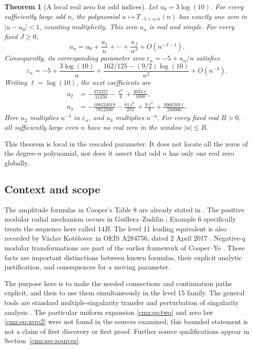 \documentclass[11pt,letterpaper]{article}
\numberwithin{equation}{section}
\newtheorem{theorem}{Theorem}[section]
\theoremstyle{definition}\newtheorem{definition}[theorem]{Definition}
\theoremstyle{remark}\newtheorem{remark}[theorem]{Remark}
\newcommand{\eps}{\varepsilon}
\begin{document}
\begin{theorem}[A local real zero for odd indices]
\label{cmz:thm:zero}
Let $u_0=3\log(10)$. For every sufficiently large odd $n$, the polynomial $u\mapsto T_{-5+u/n}(n)$ has exactly one zero in $|u-u_0|<1$, counting multiplicity. This zero $u_n$ is real and simple. For every fixed $J\geq0$,
\begin{equation}
u_n=u_0+\frac{u_1}{n}+\cdots+\frac{u_J}{n^J}+O(n^{-J-1}).
\label{cmz:eq:uexp}
\end{equation}
Consequently, its corresponding parameter zero $\eps_n=-5+u_n/n$ satisfies
\begin{equation}
\eps_n=-5+\frac{3\log(10)}{n}
 +\frac{162/125-(9/2)\log(10)}{n^2}+O(n^{-3}).
\label{cmz:eq:zero2}
\end{equation}
Writing $\ell=\log(10)$, the next coefficients are
\begin{align}
u_2&=-\frac{372357}{31250}-\frac{\ell^3}{4}+\frac{4023\ell}{1000},\label{cmz:eq:u2}\\
u_3&=-\frac{108224019}{7812500}-\frac{81\ell^2}{250}
       +\frac{9\ell^3}{8}+\frac{2066769\ell}{250000}.
\label{cmz:eq:u3}
\end{align}
Here $u_2$ multiplies $n^{-3}$ in $\eps_n$, and $u_3$ multiplies $n^{-4}$. For every fixed real $B>0$, all sufficiently large even $n$ have no real zero in the window $|u|\leq B$.
\end{theorem}

This theorem is local in the rescaled parameter. It does not locate all the zeros of the degree-$n$ polynomial, nor does it assert that odd $n$ has only one real zero globally.

\subsection{Context and scope}
The amplitude formulas in Cooper's Table 8 are already stated in \cite{Cooper}. The positive modular radial mechanism occurs in Guillera--Zudilin \cite[Example 6 and (27)]{GZ}; Example 6 specifically treats the sequence here called $14B$. The level 11 leading equivalent is also recorded by V\'aclav Kot\v{e}\v{s}ovec in OEIS A284756, dated 2 April 2017 \cite{OEIS}. Negative-$q$ modular transformations are part of the earlier framework of Cooper--Ye \cite[Section 7]{CY}. These facts are important distinctions between known formulas, their explicit analytic justification, and consequences for a moving parameter.

The purpose here is to make the needed connections and continuation paths explicit, and then to use them simultaneously in the level 15 family. The general tools are standard multiple-singularity transfer and perturbation of singularity analysis \cite[Theorem VI.5 and Section IX.7]{FS}. The particular uniform expansion \eqref{cmz:eq:two} and zero law \eqref{cmz:eq:zero2} were not found in the sources examined; this bounded statement is not a claim of first discovery or first proof. Further source qualifications appear in Section~\ref{cmz:sec:sources}.
\end{document}
